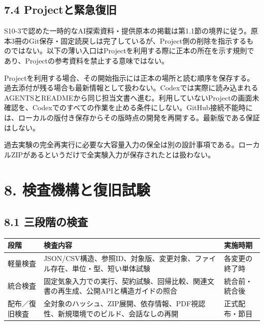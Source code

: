 \documentclass[11pt,a4paper]{article}
\newcounter{none}
\begin{document}
\subsection{7.4
Projectと緊急復旧}\label{projectux3068ux7dcaux6025ux5fa9ux65e7}

S10-3で認めた一時的なAI探索資料・提供原本の掲載は第1.1節の境界に従う。原本3冊のGit保存・固定読戻しは完了しているが、Project側の削除を指示するものではない。以下の薄い入口はProjectを利用する際に正本の所在を示す規則であり、Projectの参考資料を禁止する意味ではない。

Projectを利用する場合、その開始指示には正本の場所と読む順序を保存する。過去添付が残る場合も最新情報として扱わない。Codexでは実際に読み込まれるAGENTSとREADMEから同じ担当文書へ進む。利用していないProjectの画面未確認を、Codexでのすべての作業を止める条件にしない。GitHub接続不能時には、ローカルの版付き保存からその版時点の開発を再開する。最新版である保証はしない。

過去実験の完全再実行に必要な大容量入力の保全は別の設計事項である。ローカルZIPがあるというだけで全実験入力が保存されたとは扱わない。

\section{8.
検査機構と復旧試験}\label{ux691cux67fbux6a5fux69cbux3068ux5fa9ux65e7ux8a66ux9a13}

\subsection{8.1
三段階の検査}\label{ux4e09ux6bb5ux968eux306eux691cux67fb}

{\def\LTcaptype{none} %
\begin{longtable}[]{@{}
  >{\raggedright\arraybackslash}p{}
  >{\raggedright\arraybackslash}p{}
  >{\raggedright\arraybackslash}p{}@{}}
\toprule\noalign{}
\begin{minipage}[b]{\linewidth}\raggedright
段階
\end{minipage} & \begin{minipage}[b]{\linewidth}\raggedright
検査内容
\end{minipage} & \begin{minipage}[b]{\linewidth}\raggedright
実施時期
\end{minipage} \\
\midrule\noalign{}
\endhead
\bottomrule\noalign{}
\endlastfoot
軽量検査 &
JSON/CSV構造、参照ID、対象版、変更対象、ファイル存在、単位・型、短い単体試験
& 各変更の終了時 \\
統合検査 &
固定気象入力での実行、契約試験、回帰比較、関連文書の再生成、公開APIと構造ガイドの照合
& 統合前・統合後 \\
配布／復旧検査 &
全対象のハッシュ、ZIP展開、依存情報、PDF視認性、新規環境でのビルド、会話なしの再開
& 正式配布・節目 \\
\end{longtable}
}
\end{document}
